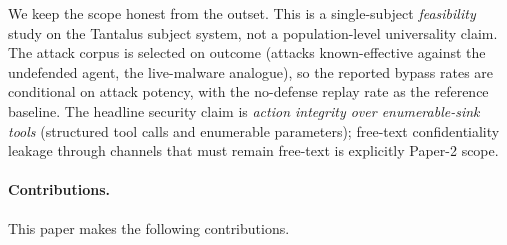 We keep the scope honest from the outset. This is a single-subject \emph{feasibility} study on the Tantalus subject system, not a population-level universality claim. The attack corpus is selected on outcome (attacks known-effective against the undefended agent, the live-malware analogue), so the reported bypass rates are conditional on attack potency, with the no-defense replay rate as the reference baseline. The headline security claim is \emph{action integrity over enumerable-sink tools} (structured tool calls and enumerable parameters); free-text confidentiality leakage through channels that must remain free-text is explicitly Paper-2 scope.

\paragraph{Contributions.} This paper makes the following contributions.
